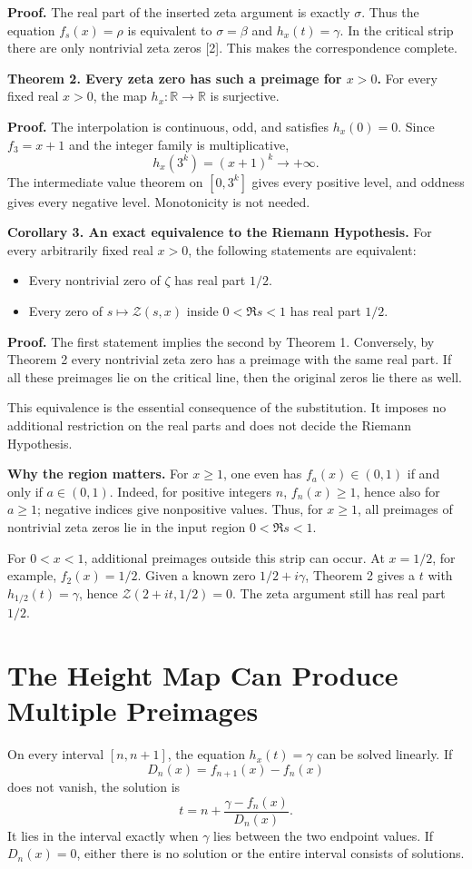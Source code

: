 \documentclass[11pt,a4paper]{article}
\newcommand{\Zcal}{\mathcal Z}
\begin{document}
\textbf{Proof.} The real part of the inserted zeta argument is exactly $\sigma$. Thus the equation $f_s(x)=\rho$ is equivalent to $\sigma=\beta$ and $h_x(t)=\gamma$. In the critical strip there are only nontrivial zeta zeros [2]. This makes the correspondence complete.

\textbf{Theorem 2. Every zeta zero has such a preimage for $x>0$.}
For every fixed real $x>0$, the map $h_x:\mathbb R\to\mathbb R$ is surjective.

\textbf{Proof.} The interpolation is continuous, odd, and satisfies $h_x(0)=0$. Since $f_3=x+1$ and the integer family is multiplicative,
\[
 h_x(3^k)=(x+1)^k\longrightarrow +\infty.
\]
The intermediate value theorem on $[0,3^k]$ gives every positive level, and oddness gives every negative level. Monotonicity is not needed.

\textbf{Corollary 3. An exact equivalence to the Riemann Hypothesis.}
For every arbitrarily fixed real $x>0$, the following statements are equivalent:
\begin{itemize}
\item Every nontrivial zero of $\zeta$ has real part $1/2$.
\item Every zero of $s\mapsto\Zcal(s,x)$ inside $0<\Re s<1$ has real part $1/2$.
\end{itemize}
\textbf{Proof.} The first statement implies the second by Theorem 1. Conversely, by Theorem 2 every nontrivial zeta zero has a preimage with the same real part. If all these preimages lie on the critical line, then the original zeros lie there as well.

This equivalence is the essential consequence of the substitution. It imposes no additional restriction on the real parts and does not decide the Riemann Hypothesis.

\textbf{Why the region matters.} For $x\ge1$, one even has $f_a(x)\in(0,1)$ if and only if $a\in(0,1)$. Indeed, for positive integers $n$, $f_n(x)\ge1$, hence also for $a\ge1$; negative indices give nonpositive values. Thus, for $x\ge1$, all preimages of nontrivial zeta zeros lie in the input region $0<\Re s<1$.

For $0<x<1$, additional preimages outside this strip can occur. At $x=1/2$, for example, $f_2(x)=1/2$. Given a known zero $1/2+i\gamma$, Theorem 2 gives a $t$ with $h_{1/2}(t)=\gamma$, hence $\Zcal(2+it,1/2)=0$. The zeta argument still has real part $1/2$.

\section{The Height Map Can Produce Multiple Preimages}
On every interval $[n,n+1]$, the equation $h_x(t)=\gamma$ can be solved linearly. If
\[
 D_n(x)=f_{n+1}(x)-f_n(x)
\]
does not vanish, the solution is
\[
 t=n+\frac{\gamma-f_n(x)}{D_n(x)}.
\]
It lies in the interval exactly when $\gamma$ lies between the two endpoint values. If $D_n(x)=0$, either there is no solution or the entire interval consists of solutions.
\end{document}
